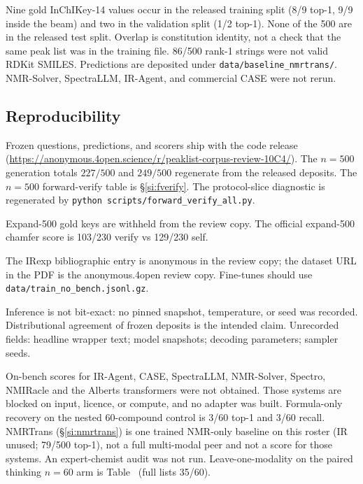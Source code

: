Nine gold InChIKey-14 values occur in the released training split
(8/9 top-1, 9/9 inside the beam) and two in the validation split
(1/2 top-1).
None of the 500 are in the released test split.
Overlap is constitution identity, not a check that the same peak list
was in the training file.
86/500 rank-1 strings were not valid RDKit SMILES.
Predictions are deposited under \texttt{data/baseline\_nmrtrans/}.
NMR-Solver, SpectraLLM, IR-Agent, and commercial CASE were not rerun.

\subsection{Reproducibility}
\label{si:repro}

Frozen questions, predictions, and scorers ship with the code release
(\url{https://anonymous.4open.science/r/peaklist-corpus-review-10C4/}).
The $n{=}500$ generation totals $227/500$ and $249/500$ regenerate from
the released deposits.
The $n{=}500$ forward-verify table is \S\ref{si:fverify}.
The protocol-slice diagnostic is regenerated by
\texttt{python scripts/forward\_verify\_all.py}.

Expand-500 gold keys are withheld from the review copy.
The official expand-500 chamfer score is 103/230 verify vs 129/230 self.

The IRexp bibliographic entry is anonymous in the review copy;
the dataset URL in the PDF is the anonymous.4open review copy.
Fine-tunes should use \texttt{data/train\_no\_bench.jsonl.gz}.

Inference is not bit-exact: no pinned snapshot, temperature, or seed
was recorded. Distributional agreement of frozen deposits is the
intended claim.
Unrecorded fields: headline wrapper text; model snapshots; decoding
parameters; sampler seeds.

On-bench scores for IR-Agent, CASE, SpectraLLM, NMR-Solver, Spectro,
NMIRacle and the Alberts transformers were not obtained.
Those systems are blocked on input, licence, or compute, and no adapter
was built.
Formula-only recovery on the nested 60-compound control is 3/60 top-1 and 3/60 recall.
NMRTrans (\S\ref{si:nmrtrans}) is one trained NMR-only baseline on this
roster (IR unused; 79/500 top-1), not a full multi-modal peer and not a
score for those systems.
An expert-chemist audit was not run.
Leave-one-modality on the paired thinking $n{=}60$ arm is Table~ (full lists 35/60).

